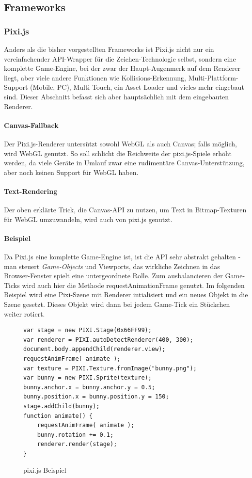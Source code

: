 \documentclass[a4paper, 12pt]{article}
\begin{document}
\subsection{Frameworks}
\subsubsection{Pixi.js} Anders als die bisher vorgestellten Frameworks ist Pixi.js nicht nur ein vereinfachender API-Wrapper für die Zeichen-Technologie selbst, sondern eine komplette Game-Engine, bei der zwar der Haupt-Augenmerk auf dem Renderer liegt, aber viele andere Funktionen wie Kollisions-Erkennung, Multi-Plattform-Support (Mobile, PC), Multi-Touch, ein Asset-Loader und vieles mehr eingebaut sind. Dieser Abschnitt befasst sich aber hauptsächlich mit dem eingebauten Renderer.
\paragraph{Canvas-Fallback} Der Pixi.js-Renderer untersützt sowohl WebGL als auch Canvas; falls möglich, wird WebGL genutzt. So soll schlicht die Reichweite der pixi.js-Spiele erhöht werden, da viele Geräte in Umlauf zwar eine rudimentäre Canvas-Unterstützung, aber noch keinen Support für WebGL haben.
\paragraph{Text-Rendering} Der oben erklärte Trick, die Canvas-API zu nutzen, um Text in Bitmap-Texturen für WebGL umzuwandeln, wird auch von pixi.js genutzt.
\paragraph{Beispiel}
Da Pixi.js eine komplette Game-Engine ist, ist die API sehr abstrakt gehalten - man steuert \emph{Game-Objects} und Viewports, das wirkliche Zeichnen in das Browser-Fenster spielt eine untergeordnete Rolle. Zum ausbalancieren der Game-Ticks wird auch hier die Methode requestAnimationFrame genutzt.  Im folgenden Beispiel wird eine Pixi-Szene mit Renderer intialisiert und ein neues Objekt in die Szene gesetzt. Dieses Objekt wird dann bei jedem Game-Tick ein Stückchen weiter rotiert.
\begin{figure}[h!]
	\begin{verbatim}
var stage = new PIXI.Stage(0x66FF99);
var renderer = PIXI.autoDetectRenderer(400, 300);
document.body.appendChild(renderer.view);
requestAnimFrame( animate );
var texture = PIXI.Texture.fromImage("bunny.png");
var bunny = new PIXI.Sprite(texture);
bunny.anchor.x = bunny.anchor.y = 0.5;
bunny.position.x = bunny.position.y = 150;
stage.addChild(bunny);
function animate() {
    requestAnimFrame( animate );
    bunny.rotation += 0.1;
    renderer.render(stage);
}
    \end{verbatim}
    \caption{pixi.js Beispiel}
    \label{pixijs_example}
\end{figure}
\end{document}
